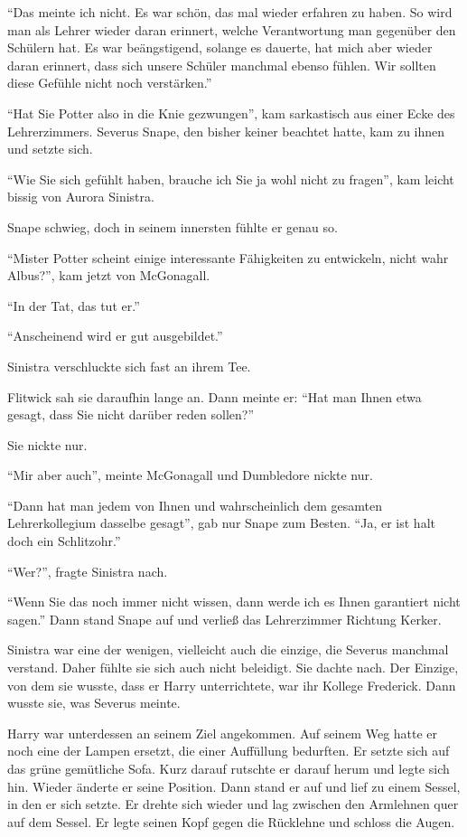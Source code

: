 \enquote{Das meinte ich nicht. Es war schön, das mal wieder erfahren zu haben. So wird man als Lehrer wieder daran erinnert, welche Verantwortung man gegenüber den Schülern hat. Es war beängstigend, solange es dauerte, hat mich aber wieder daran erinnert, dass sich unsere Schüler manchmal ebenso fühlen. Wir sollten diese Gefühle nicht noch verstärken.}

\enquote{Hat Sie Potter also in die Knie gezwungen}, kam sarkastisch aus einer Ecke des Lehrerzimmers. Severus Snape, den bisher keiner beachtet hatte, kam zu ihnen und setzte sich.

\enquote{Wie Sie sich gefühlt haben, brauche ich Sie ja wohl nicht zu fragen}, kam leicht bissig von Aurora Sinistra.

Snape schwieg, doch in seinem innersten fühlte er genau so.

\enquote{Mister Potter scheint einige interessante Fähigkeiten zu entwickeln, nicht wahr Albus?}, kam jetzt von McGonagall.

\enquote{In der Tat, das tut er.}

\enquote{Anscheinend wird er gut ausgebildet.}

Sinistra verschluckte sich fast an ihrem Tee.

Flitwick sah sie daraufhin lange an. Dann meinte er: \enquote{Hat man Ihnen etwa gesagt, dass Sie nicht darüber reden sollen?}

Sie nickte nur.

\enquote{Mir aber auch}, meinte McGonagall und Dumbledore nickte nur.

\enquote{Dann hat man jedem von Ihnen und wahrscheinlich dem gesamten Lehrerkollegium dasselbe gesagt}, gab nur Snape zum Besten. \enquote{Ja, er ist halt doch ein Schlitzohr.}

\enquote{Wer?}, fragte Sinistra nach.

\enquote{Wenn Sie das noch immer nicht wissen, dann werde ich es Ihnen garantiert nicht sagen.} Dann stand Snape auf und verließ das Lehrerzimmer Richtung Kerker.

Sinistra war eine der wenigen, vielleicht auch die einzige, die Severus manchmal verstand. Daher fühlte sie sich auch nicht beleidigt. Sie dachte nach. Der Einzige, von dem sie wusste, dass er Harry unterrichtete, war ihr Kollege Frederick. Dann wusste sie, was Severus meinte.

Harry war unterdessen an seinem Ziel angekommen. Auf seinem Weg hatte er noch eine der Lampen ersetzt, die einer Auffüllung bedurften. Er setzte sich auf das grüne gemütliche Sofa. Kurz darauf rutschte er darauf herum und legte sich hin. Wieder änderte er seine Position. Dann stand er auf und lief zu einem Sessel, in den er sich setzte. Er drehte sich wieder und lag zwischen den Armlehnen quer auf dem Sessel. Er legte seinen Kopf gegen die Rücklehne und schloss die Augen.


